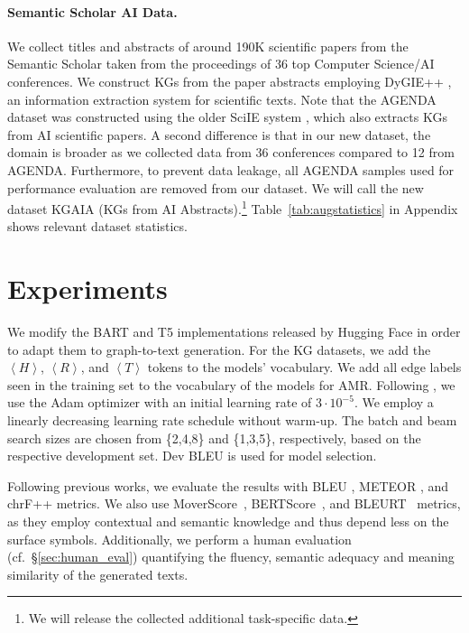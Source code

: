 \documentclass[11pt]{article}
\newcommand{\ourtag}[1]{\ensuremath{\left\langle #1 \right\rangle}}
\begin{document}
\paragraph{Semantic Scholar AI Data.} We collect titles and abstracts of around 190K scientific papers from the Semantic Scholar \cite{ammar-etal-2018-construction} taken from the proceedings of 36 top Computer Science/AI conferences. We construct KGs from the paper abstracts employing DyGIE++ \cite{wadden-etal-2019-entity}, an information extraction system for scientific texts. Note that the AGENDA dataset was constructed using the older SciIE system \cite{luan-etal-2018-multi}, which also extracts KGs from AI scientific papers. A second difference is that in our new dataset, the domain is broader as we collected data from 36 conferences compared to 12 from AGENDA. Furthermore, to prevent data leakage, all AGENDA samples used for performance evaluation are removed from our dataset. We will call the new dataset \textsc{KGAIA} (KGs from AI Abstracts).\footnote{We will release the collected additional task-specific data.} Table~\ref{tab:augstatistics} in Appendix shows relevant dataset statistics.



\section{Experiments}



We modify the BART and T5 implementations released by Hugging Face \citep{wolf2019huggingfaces} in order to adapt them to graph-to-text generation. For the KG datasets, we add the \ourtag{H}, \ourtag{R}, and \ourtag{T} tokens to the models' vocabulary. We add all edge labels seen in the training set to the vocabulary of the models for AMR. Following \citet{wolf2019huggingfaces}, we use the Adam optimizer \cite{kingma:adam} with an initial learning rate of $3 \cdot 10^{-5}$. We employ a linearly decreasing learning rate schedule without warm-up. The batch and beam search sizes are chosen from \{2,4,8\} and \{1,3,5\}, respectively, based on the respective development set. Dev BLEU is used for model selection. 




Following previous works, we evaluate the results with BLEU \cite{Papineni:2002:BMA:1073083.1073135}, METEOR \cite{Denkowski14meteoruniversal}, and chrF++ \cite{popovic-2015-chrf} metrics. We also use MoverScore~\cite{zhao-etal-2019-moverscore}, BERTScore~\cite{bert-score}, and BLEURT~\cite{sellam-etal-2020-bleurt} metrics, as they employ contextual and semantic knowledge and thus depend less on the surface symbols. Additionally, we perform a human evaluation (cf.\ \S\ref{sec:human_eval}) quantifying the fluency, semantic adequacy and meaning similarity of the generated texts.
\end{document}
